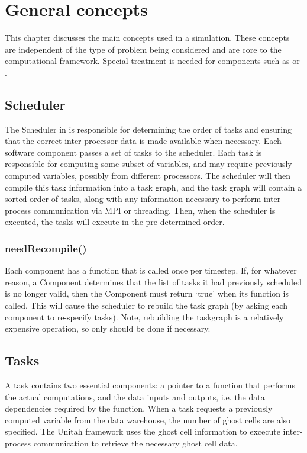 \chapter{General concepts}
This chapter discusses the main concepts used in a \Vaango simulation.
These concepts are independent of the type of problem being considered
and are core to the computational framework.  Special treatment is needed
for components such as  or .

\section{Scheduler}

The Scheduler in \Vaango is responsible for determining the order of
tasks and ensuring that the correct inter-processor data is made
available when necessary. Each software component passes a set of
tasks to the scheduler. Each task is responsible for computing some
subset of variables, and may require previously computed variables,
possibly from different processors. The scheduler will then compile
this task information into a task graph, and the task graph will
contain a sorted order of tasks, along with any information necessary
to perform inter-process communication via MPI or threading. Then, when the
scheduler is executed, the tasks will execute in the pre-determined
order.

\subsection{needRecompile()}


Each component has a  function that is called once per
timestep.  If, for whatever reason, a Component determines that the
list of tasks it had previously scheduled is no longer valid, then the
Component must return `true' when its  function is
called.  This will cause the scheduler to rebuild the task graph (by
asking each component to re-specify tasks).  Note, rebuilding the
taskgraph is a relatively expensive operation, so only should be done
if necessary.

\section{Tasks}

A task contains two essential components: a pointer to a function
that performs the actual computations, and the data inputs and
outputs, i.e. the data dependencies required by the function.  When a
task requests a previously computed variable from the data warehouse,
the number of ghost cells are also specified.  The Unitah framework
uses the ghost cell information to excecute inter-process
communication to retrieve the necessary ghost cell data.

